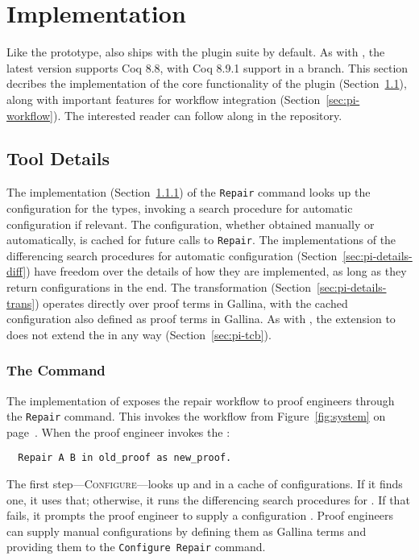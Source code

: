 \section{Implementation}
\label{sec:pi-implementation}

Like the \kl{\sysname} prototype,
\toolnamec also ships with the \sysnamelong plugin suite by default.
As with \sysname, the latest version supports Coq 8.8, with Coq 8.9.1 support in a branch.
This section decribes the implementation of the core functionality of the \toolnamec plugin (Section~\ref{sec:pi-details}),
along with important features for workflow integration (Section~\ref{sec:pi-workflow}).
The interested reader can follow along in the repository.

\subsection{Tool Details}
\label{sec:pi-details}

The implementation (Section~\ref{sec:pi-details-command}) of the \lstinline{Repair} command
looks up the configuration for the types, invoking a search procedure for automatic configuration if relevant.
The configuration, whether obtained manually or automatically, is cached for future calls to \lstinline{Repair}.
The implementations of the differencing search procedures for automatic configuration (Section~\ref{sec:pi-details-diff})
have freedom over the details of how they are implemented, as long as they return configurations in the end.
The transformation (Section~\ref{sec:pi-details-trans}) operates directly over proof terms in Gallina, with the cached configuration
also defined as proof terms in Gallina.
As with \sysname, the \toolnamec extension to \sysnamelong does not extend the  in any way (Section~\ref{sec:pi-tcb}).

\subsubsection{The Command}
\label{sec:pi-details-command}

The implementation of \toolnamec exposes the repair workflow
to proof engineers through the \lstinline{Repair} command. %
This invokes the workflow from Figure~\ref{fig:system} on page~\pageref{fig:system}.
When the proof engineer invokes the :

\begin{lstlisting}
  Repair A B in old_proof as new_proof.
\end{lstlisting}
The first step---\textsc{Configure}---looks up \Aa and \B in a cache of configurations.
If it finds one, it uses that; otherwise, it runs the differencing search procedures for .
If that fails, it prompts the proof engineer to supply a configuration .
Proof engineers can supply manual configurations by defining them as Gallina terms and
providing them to the \lstinline{Configure Repair} command.

